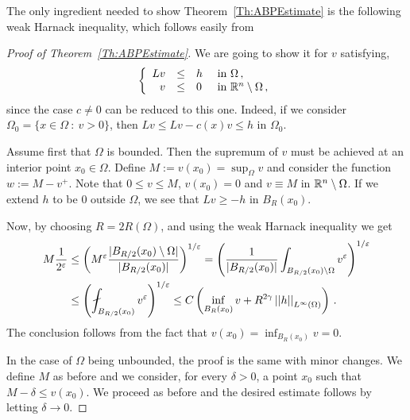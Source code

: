 The only ingredient needed to show Theorem~\ref{Th:ABPEstimate} is the following weak Harnack inequality, which follows easily from \cite{DiCastoKuusiPalatucci}


\begin{proof}[Proof of Theorem~\ref{Th:ABPEstimate}]
	We are going to show it for $v$ satisfying,
	$$
	\left\{\begin{array}{rcll}
	Lv &\leq & h & \text{ in } \Omega\,, \\
	v & \leq & 0 & \text{ in } \mathbb{R}^n\setminus \Omega\,,
	\end{array} \right.
	$$
	since the case $c\neq 0$ can be reduced to this one. Indeed, if we consider $\Omega_0 = \{x \in \Omega \ : \ v > 0\}$, then $Lv \leq Lv - c(x)v \leq h$ in $\Omega_0$.
	
	Assume first that $\Omega$ is bounded. Then the supremum of $v$ must be achieved at an interior point $x_0\in \Omega$. Define	$M:= v(x_0) = \sup_\Omega v$ and consider the function $w := M - v^+$. Note that $0 \leq v \leq M$, $v(x_0) = 0$ and $v \equiv M$ in $\mathbb{R}^n \setminus \Omega$. If we extend $h$ to be $0$ outside $\Omega$, we see that $Lv \geq -h$ in $B_R(x_0)$. 
	
	Now, by choosing $R= 2R(\Omega)$, and using the weak Harnack inequality  we get
	\begin{align*}
		M \dfrac{1}{2^\varepsilon} & \leq \bpar{M^{\varepsilon}\dfrac{|B_{R/2}(x_0)\setminus \Omega|}{|B_{R/2}(x_0)|}}^{1/\varepsilon}= \bpar{\dfrac{1}{|B_{R/2}(x_0)|} \int_{B_{R/2}(x_0)\setminus \Omega} v^\varepsilon}^{1/\varepsilon} \\ 
		& \leq \bpar{ \fint_{B_{R/2}(x_0)} v^\varepsilon}^{1/\varepsilon} \leq C \bpar{\inf_{B_{R}(x_0)} v + R^{2\s} \norm{h}_{L^{\infty}(\Omega)} }\,.
	\end{align*}
	The conclusion follows from the fact that $v(x_0)= \inf_{B_{R}(x_0)} v = 0$.
	
	In the case of $\Omega$ being unbounded, the proof is the same with minor changes. We define $M$ as before and we consider, for every $\delta > 0$, a point $x_0$ such that $M-\delta \leq v(x_0)$. We proceed as before and the desired estimate follows by letting $\delta \to 0$. 
\end{proof}
 



